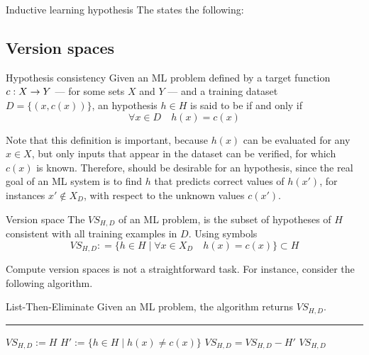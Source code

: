 \documentclass[a4paper, 12pt]{report}
\begin{document}
    \begin{frameddefn}{Inductive learning hypothesis}
        The  states the following: 
    \end{frameddefn}

    \subsection{Version spaces}

    \begin{frameddefn}{Hypothesis consistency}
        Given an ML problem defined by a target function $c : X \to Y$ --- for some sets $X$ and $Y$ --- and a training dataset $D = \{(x, c(x))\}$, an hypothesis $h \in H$ is said to be  if and only if $$\forall x \in D \quad h(x) = c(x)$$
    \end{frameddefn}

    Note that this definition is important, because $h(x)$ can be evaluated for any $x \in X$, but only inputs that appear in the dataset can be verified, for which $c(x)$ is known. Therefore,  should be desirable for an hypothesis, since the real goal of an ML system is to find  $h$ that predicts correct values of $h(x')$, for instances $x' \notin X_D$, with respect to the unknown values $c(x')$.

    \begin{frameddefn}{Version space}
        The  $VS_{H, D}$ of an ML problem, is the subset of hypotheses of $H$ consistent with all training examples in $D$. Using symbols $$VS_{H, D}: = \{h \in H \mid \forall x \in X_D \quad h(x) = c(x)\} \subset H$$
    \end{frameddefn}

    Compute version spaces is not a straightforward task. For instance, consider the following algorithm.

    \begin{framedalgo}{List-Then-Eliminate}
        Given an ML problem, the algorithm returns $VS_{H, D}$. \\
        \hrule
        \quad
        \label{alg:lte}
        \begin{algorithmic}[1]
                \State $VS_{H, D} := H$ 
                    \State $H' := \{h \in H \mid h(x) \neq c(x)\}$ 
                    \State $VS_{H, D} = VS_{H, D} - H'$
                \EndFor
                \State {} $VS_{H,D}$
            \EndFunction
        \end{algorithmic}
    \end{framedalgo}
\end{document}
